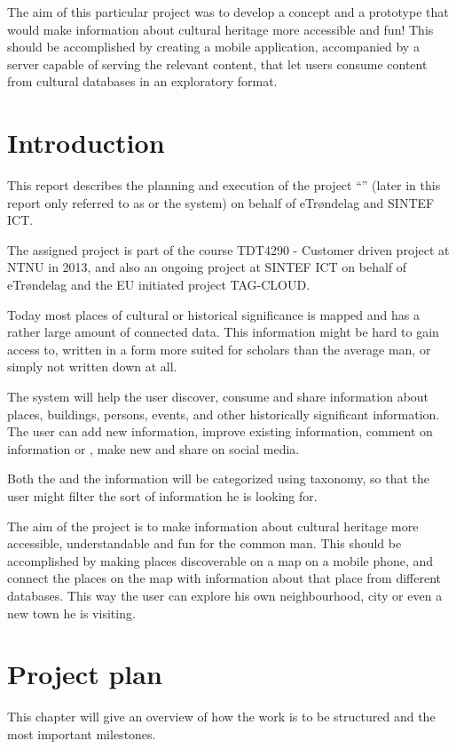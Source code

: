 \documentclass[11pt]{book}
\begin{document}
The aim of this particular project was to develop a concept and a prototype that would make information about cultural heritage more accessible and fun! This should be accomplished by creating a mobile application, accompanied by a server capable of serving the relevant content, that let users consume content from cultural databases in an exploratory format.


\tableofcontents
\listoffigures
\listoftables
\glsaddall
{}
\printglossaries

\mainmatter
\chapter{Introduction}
This report describes the planning and execution of the project ``\fullprojectname'' (later in this report only referred to as \shortprojectname or the system) on behalf of eTrøndelag and SINTEF ICT.

The assigned project is part of the course TDT4290 - Customer driven project at NTNU in 2013, and also an ongoing project at SINTEF ICT on behalf of eTrøndelag and the EU initiated project TAG-CLOUD.

Today most places of cultural or historical significance is mapped and has a rather large amount of connected data. This information might be hard to gain access to, written in a form more suited for scholars than the average man, or simply not written down at all.

The system will help the user discover, consume and share information about places, buildings, persons, events, and other historically significant information. The user can add new information, improve existing information, comment on information or \wallentityp, make new \wallentityp and share \wallentityp on social media.

Both the \wallentityp and the information will be categorized using taxonomy, so that the user might filter the sort of information he is looking for.

The aim of the project is to make information about cultural heritage more accessible, understandable and fun for the common man. This should be accomplished by making places discoverable on a map on a mobile phone, and connect the places on the map with information about that place from different databases. This way the user can explore his own neighbourhood, city or even a new town he is visiting.

\chapter{Project plan}
\label{chap:project_plan}
This chapter will give an overview of how the work is to be structured and the most important milestones.
\end{document}
